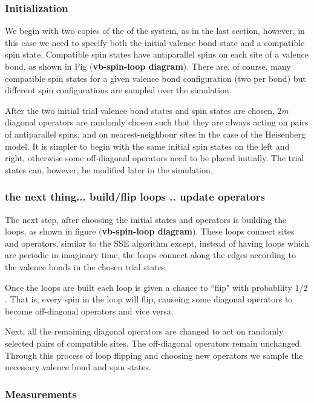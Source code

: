 \documentclass[prb,aps,twocolumn,floatfix,amsmath,amssymb,superscriptaddress,tightenlines]{revtex4}
\begin{document}
\subsubsection{Initialization}
We begin with two copies of the of the system, as in the last section, however, in this case we need to specify both the initial valence bond state and a compatible spin state.
Compatible spin states have antiparallel spins on each site of a valence bond, as shown in Fig ({\bf \!vb-spin-loop diagram}).  There are, of course, many compatible spin states for a given valence bond configuration (two per bond) but different spin configurations are sampled over the simulation.

After the two initial trial valence bond states and spin states are chosen, $2m$ diagonal operators are randomly chosen such that they are always acting on pairs of antiparallel spins, and on nearest-neighbour sites in the case of the Heisenberg model.
It is simpler to begin with the same initial spin states on the left and right, otherwise some off-diagonal operators need to be placed initially.
The trial states can, however, be modified later in the simulation.

\subsubsection{the next thing... build/flip loops .. update operators}

The next step, after choosing the initial states and operators is building the loops, as shown in figure ({\bf \!vb-spin-loop diagram}). 
These loops connect sites and operators, similar to the SSE algorithm except, instead of having loops which are periodic in imaginary time, the loops connect along the edges according to the valence bonds in the chosen trial states.

Once the loops are built each loop is given a chance to ``flip" with probability $1/2$.  That is, every spin in the loop will flip, causeing some diagonal operators to become off-diagonal operators and vice versa.  

Next, all the remaining diagonal operators are changed to act on randomly selected pairs of compatible sites.
The off-diagonal operators remain unchanged.
Through this process of loop flipping and choosing new operators we sample the necessary valence bond and spin states.

\subsubsection{Measurements}
\end{document}
